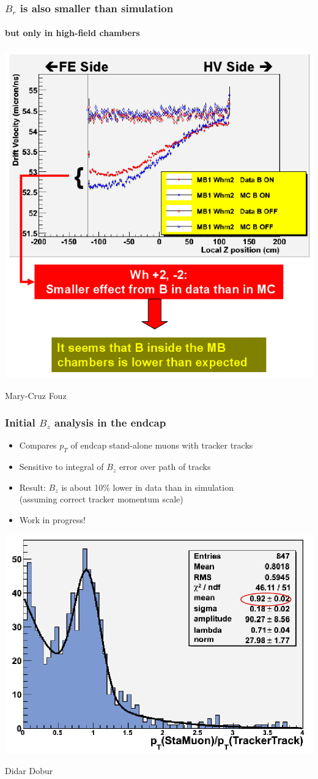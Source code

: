 \documentclass[compress]{beamer}
\begin{document}
\begin{frame}
\frametitle{$B_r$ is also smaller than simulation}
\framesubtitle{but only in high-field chambers}

\vspace{-0.25 cm}
\begin{center}
\includegraphics[width=0.7\linewidth]{cruz_analysis.png}
\end{center}

\vspace{-0.75 cm}
\hfill {\tiny Mary-Cruz Fouz}
\end{frame}

\begin{frame}
\frametitle{Initial $B_z$ analysis in the endcap}

\begin{itemize}
\item Compares $p_T$ of endcap stand-alone muons with tracker tracks
\item Sensitive to integral of $B_z$ error over path of tracks
\item Result: $B_z$ is about 10\% lower in data than in simulation \\ (assuming correct tracker momentum scale)
\item Work in progress!
\end{itemize}

\begin{center}
\includegraphics[width=0.7\linewidth]{endcap_result.png}
\end{center}

\vspace{-0.75 cm}
\hfill {\tiny Didar Dobur}
\end{frame}
\end{document}
